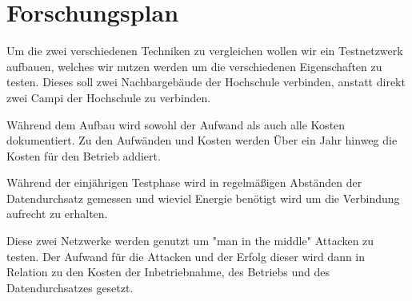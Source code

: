 \chapter{Forschungsplan}

Um die zwei verschiedenen Techniken zu vergleichen wollen wir ein Testnetzwerk aufbauen, welches wir nutzen werden um die verschiedenen Eigenschaften zu testen.
Dieses soll zwei Nachbargebäude der Hochschule verbinden, anstatt direkt zwei Campi der Hochschule zu verbinden.

Während dem Aufbau wird sowohl der Aufwand als auch alle Kosten dokumentiert.
Zu den Aufwänden und Kosten werden Über ein Jahr hinweg die Kosten für den Betrieb addiert.

Während der einjährigen Testphase wird in regelmäßigen Abständen der Datendurchsatz gemessen und wieviel Energie benötigt wird um die Verbindung aufrecht zu erhalten.

Diese zwei Netzwerke werden genutzt um "man in the middle" Attacken zu testen.
Der Aufwand für die Attacken und der Erfolg dieser wird dann in Relation zu den Kosten der Inbetriebnahme, des Betriebs und des Datendurchsatzes gesetzt.

